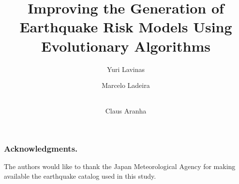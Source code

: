 \documentclass{article}
\begin{document}
\title{Improving the Generation of Earthquake Risk Models Using
  Evolutionary Algorithms}

\author{
  Yuri Lavinas \and
  Marcelo Ladeira \and \\ 
  Claus Aranha
}


\begin{abstract}

\end{abstract}


 






\subsubsection*{Acknowledgments.} 
The authors would like to thank the Japan Meteorological Agency for
making available the earthquake catalog used in this study.



\end{document}

